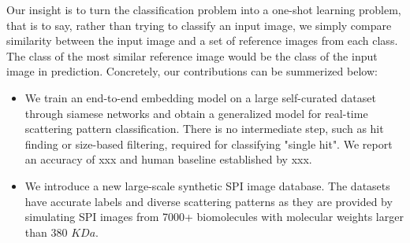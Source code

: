 
Our insight is to turn the classification problem into a one-shot learning
problem, that is to say, rather than trying to classify an input image, we
simply compare similarity between the input image and a set of reference images
from each class.  The class of the most similar reference image would be the
class of the input image in prediction. Concretely, our contributions can be
summerized below:

\begin{itemize}

    \item We train an end-to-end embedding model on a large self-curated dataset
    through siamese networks and obtain a generalized model for real-time
    scattering pattern classification.  There is no intermediate step, such as
    hit finding or size-based filtering, required for classifying "single hit".
    We report an accuracy of {\color{red} xxx} and human baseline established by
    {\color{red} xxx}.  

    \item We introduce a new large-scale synthetic SPI image database.  The
    datasets have accurate labels and diverse scattering patterns as they are
    provided by simulating SPI images from {\color{red} 7000+} biomolecules with
    molecular weights larger than 380 $KDa$.  

\end{itemize}





